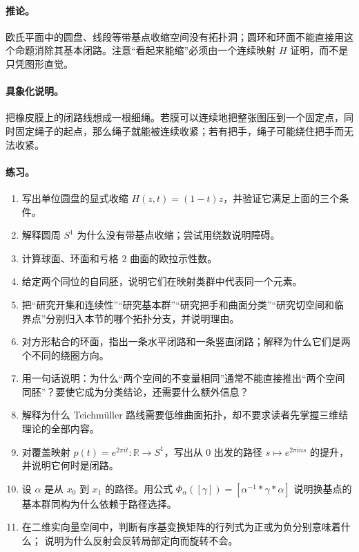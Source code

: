 \documentclass[UTF8,fontset=none,a4paper,11pt]{ctexart}
\theoremstyle{foundation-definition}
\theoremstyle{foundation-theorem}
\theoremstyle{foundation-proposition}
\theoremstyle{foundation-example}
\theoremstyle{foundation-remark}
\theoremstyle{foundation-theorem}
\begin{document}
\paragraph{推论。}
欧氏平面中的圆盘、线段等带基点收缩空间没有拓扑洞；圆环和环面不能直接用这个命题消除其基本闭路。注意“看起来能缩”必须由一个连续映射 \(H\) 证明，而不是只凭图形直觉。

\paragraph{具象化说明。}
把橡皮膜上的闭路线想成一根细绳。若膜可以连续地把整张图压到一个固定点，同时固定绳子的起点，那么绳子就能被连续收紧；若有把手，绳子可能绕住把手而无法收紧。

\clearpage
\thispagestyle{fancy}
\paragraph{练习。}
\begin{enumerate}[label=M4.\arabic*.]
  \item 写出单位圆盘的显式收缩 \(H(z,t)=(1-t)z\)，并验证它满足上面的三个条件。
  \item 解释圆周 \(S^1\) 为什么没有带基点收缩；尝试用绕数说明障碍。
  \item 计算球面、环面和亏格 \(2\) 曲面的欧拉示性数。
  \item 给定两个同位的自同胚，说明它们在映射类群中代表同一个元素。
  \item 把“研究开集和连续性”“研究基本群”“研究把手和曲面分类”“研究切空间和临界点”分别归入本节的哪个拓扑分支，并说明理由。
  \item 对方形粘合的环面，指出一条水平闭路和一条竖直闭路；解释为什么它们是两个不同的绕圈方向。
  \item 用一句话说明：为什么“两个空间的不变量相同”通常不能直接推出“两个空间同胚”？要使它成为分类结论，还需要什么额外信息？
  \item 解释为什么 Teichmüller 路线需要低维曲面拓扑，却不要求读者先掌握三维结理论的全部内容。
  \item 对覆盖映射 \(p(t)=e^{2\pi i t}:\mathbb R\to S^1\)，写出从 \(0\) 出发的路径
  \(s\mapsto e^{2\pi i ns}\) 的提升，并说明它何时是闭路。
  \item 设 \(\alpha\) 是从 \(x_0\) 到 \(x_1\) 的路径。用公式
  \(\Phi_\alpha([\gamma])=[\alpha^{-1}*\gamma*\alpha]\) 说明换基点的基本群同构为什么依赖于路径选择。
  \item 在二维实向量空间中，判断有序基变换矩阵的行列式为正或为负分别意味着什么；
  说明为什么反射会反转局部定向而旋转不会。
\end{enumerate}
\end{document}

